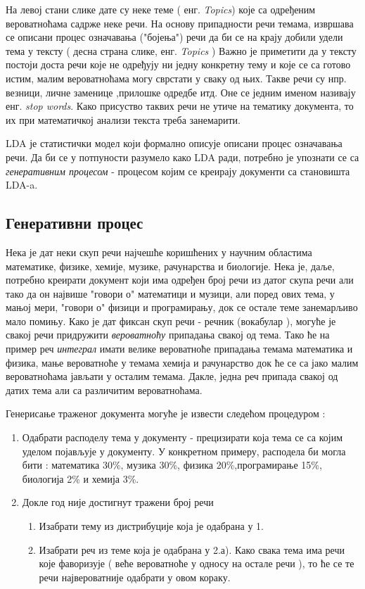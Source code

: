 На левој стани слике дате су неке теме ( енг. \textit{Topics}) које са одређеним вероватноћама садрже неке речи. На основу припадности речи темама, извршава се описани процес означавања ("бојења") речи да би се на крају добили удели тема у тексту ( десна страна слике, енг. \textit{Topics })
Важно је приметити да у тексту постоји доста речи које не одређују ни једну конкретну тему и које се са готово истим, малим вероватноћама могу сврстати у сваку од њих. Такве речи су нпр. везници, личне заменице ,прилошке одредбе итд. Оне се једним именом називају енг. \textit{stop words}. Како присуство таквих речи не утиче на тематику документа, то их при математичкој анализи текста треба занемарити.  



LDA је статистички модел који формално описује описани процес означавања речи. Да би се у потпуности разумело како LDA ради, потребно је упознати се са   \textit{генеративним процесом} -  процесом којим се креирају документи са становишта LDA-a.

\subsection{Генеративни процес}
Нека је дат неки скуп речи најчешће коришћених у научним областима математике, физике, хемије, музике, рачунарства и биологије. Нека је, даље, потребно креирати документ који има одређен број речи из датог скупа речи али тако да он највише "говори о"  математици и музици, али поред ових тема, у мањој мери, "говори о" физици и програмирању, док се остале теме занемарљиво мало помињу.
Како је дат фиксан скуп речи - речник (вокабулар ), могуће је свакој речи придружити \textit{вероватноћу} припадања свакој од тема. Тако ће на пример реч \textit{интеграл} имати велике вероватноће припадања темама математика и физика, мање вероватноће у темама хемија и рачунарство док ће се са јако малим вероватноћама јављати у осталим темама. Дакле, једна реч припада свакој од датих тема али са различитим вероватноћама. 

Генерисање траженог документа могуће је извести следећом процедуром :

\begin{enumerate}
 \item Одабрати расподелу тема у документу - прецизирати која тема се са којим уделом појављује у документу. У конкретном примеру, расподела би могла бити : математика 30\%, музика 30\%, физика 20\%,програмирање 15\%, биологија 2\% и хемија 3\%.
 \item Докле год није достигнут тражени број речи
 	\begin{enumerate}
	\item Изабрати тему из дистрибуције која је одабрана у 1.
	\item Изабрати реч из теме која је одабрана у 2.а). Како свака тема има речи које фаворизује ( веће вероватноће у односу на остале речи ), то ће се те речи највероватније одабрати у овом кораку.
	\end{enumerate}

 \end{enumerate}

